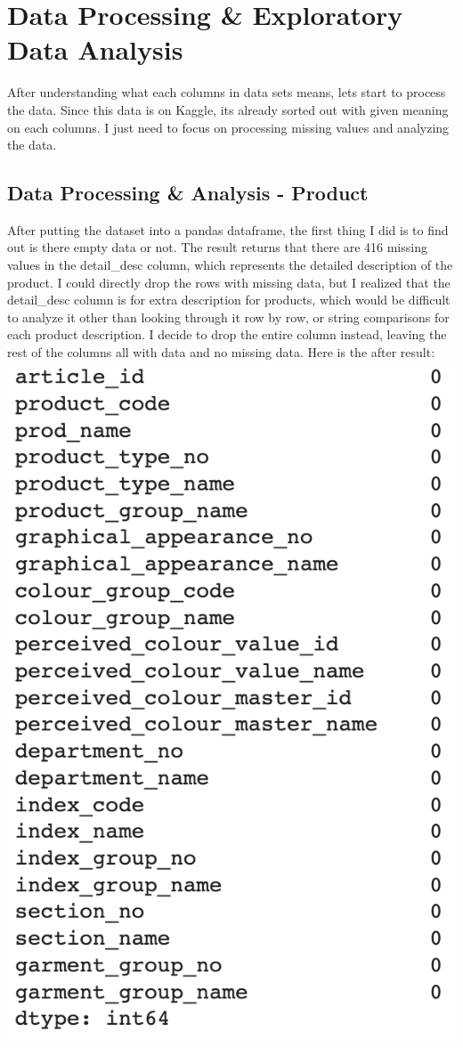 \documentclass{article}
\begin{document}
\section{Data Processing \& Exploratory Data Analysis}
After understanding what each columns in data sets means, lets start to process the data. Since this data is on Kaggle, its already sorted out with given meaning on each columns. I just need to focus on processing missing values and analyzing the data.

\subsection{Data Processing & Analysis - Product}
After putting the dataset into a pandas dataframe, the first thing I did is to find out is there empty data or not. The result returns that there are 416 missing values in the detail\_desc column, which represents the detailed description of the product. I could directly drop the rows with missing data, but I realized that the detail\_desc column is for extra description for products, which would be difficult to analyze it other than looking through it row by row, or string comparisons for each product description. I decide to drop the entire column instead, leaving the rest of the columns all with data and no missing data. Here is the after result:\\
\includegraphics[]{AfterDropProduct}
\end{document}
